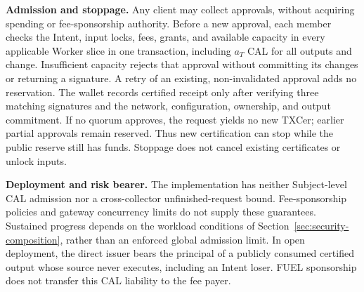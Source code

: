 \noindent\textbf{Admission and stoppage.}
Any client may collect approvals, without acquiring spending or
fee-sponsorship authority. Before a new approval, each member checks
the Intent, input locks, fees, grants, and available capacity in every
applicable Worker slice in one transaction, including $a_T$ CAL for all outputs and change. Insufficient capacity
rejects that approval without committing its changes or returning a
signature. A retry of an existing, non-invalidated approval adds no
reservation. The wallet records certified receipt only after verifying
three matching signatures and the network, configuration, ownership,
and output commitment. If no quorum approves, the request yields no
new TXCer; earlier partial approvals remain reserved. Thus new
certification can stop while the public reserve still has funds.
Stoppage does not cancel existing certificates or unlock inputs.

\noindent\textbf{Deployment and risk bearer.}
The implementation has neither Subject-level CAL admission nor a
cross-collector unfinished-request bound. Fee-sponsorship policies and
gateway concurrency limits do not supply these guarantees. Sustained
progress depends on the workload conditions of
Section~\ref{sec:security-composition}, rather than an enforced global
admission limit. In open deployment, the direct issuer bears the
principal of a publicly consumed certified output whose source never
executes, including an Intent loser. FUEL sponsorship does not transfer
this CAL liability to the fee payer.
